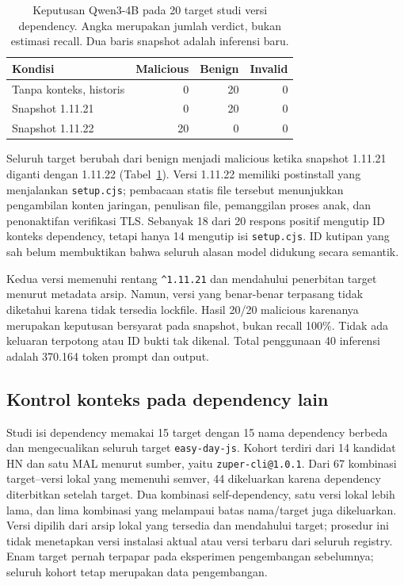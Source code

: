 \begin{table}[t]
\caption{Keputusan Qwen3-4B pada 20 target studi versi dependency. Angka
merupakan jumlah verdict, bukan estimasi recall. Dua baris snapshot adalah
inferensi baru.}
\label{tab:dependency-versions}
\centering
\begin{tabular}{lrrr}
\toprule
Kondisi & Malicious & Benign & Invalid \\
\midrule
Tanpa konteks, historis & 0 & 20 & 0 \\
Snapshot 1.11.21 & 0 & 20 & 0 \\
Snapshot 1.11.22 & 20 & 0 & 0 \\
\bottomrule
\end{tabular}
\end{table}

Seluruh target berubah dari benign menjadi malicious ketika snapshot
1.11.21 diganti dengan 1.11.22 (Tabel~\ref{tab:dependency-versions}).
Versi 1.11.22 memiliki postinstall yang menjalankan \texttt{setup.cjs};
pembacaan statis file tersebut menunjukkan pengambilan konten jaringan,
penulisan file, pemanggilan proses anak, dan penonaktifan verifikasi TLS.
Sebanyak 18 dari 20 respons positif mengutip ID konteks dependency,
tetapi hanya 14 mengutip isi \texttt{setup.cjs}. ID kutipan yang sah belum
membuktikan bahwa seluruh alasan model didukung secara semantik.

Kedua versi memenuhi rentang \texttt{\textasciicircum1.11.21} dan
mendahului penerbitan target menurut metadata arsip. Namun, versi yang
benar-benar terpasang tidak diketahui karena tidak tersedia lockfile.
Hasil 20/20 malicious karenanya merupakan keputusan bersyarat pada snapshot,
bukan recall 100\%. Tidak ada keluaran terpotong atau ID bukti tak dikenal.
Total penggunaan 40 inferensi adalah 370.164 token prompt dan output.

\subsection{Kontrol konteks pada dependency lain}
\label{sec:dependency-generalization}

Studi isi dependency memakai 15 target dengan 15 nama dependency berbeda dan
mengecualikan seluruh target \texttt{easy-day-js}. Kohort terdiri dari 14
kandidat HN dan satu MAL menurut sumber, yaitu \texttt{zuper-cli@1.0.1}. Dari
67 kombinasi target--versi lokal yang memenuhi semver, 44 dikeluarkan karena
dependency diterbitkan setelah target. Dua kombinasi self-dependency, satu
versi lokal lebih lama, dan lima kombinasi yang melampaui batas nama/target
juga dikeluarkan. Versi dipilih dari arsip lokal yang tersedia dan mendahului
target; prosedur ini tidak menetapkan versi instalasi aktual atau versi
terbaru dari seluruh registry. Enam target pernah terpapar pada eksperimen
pengembangan sebelumnya; seluruh kohort tetap merupakan data pengembangan.

